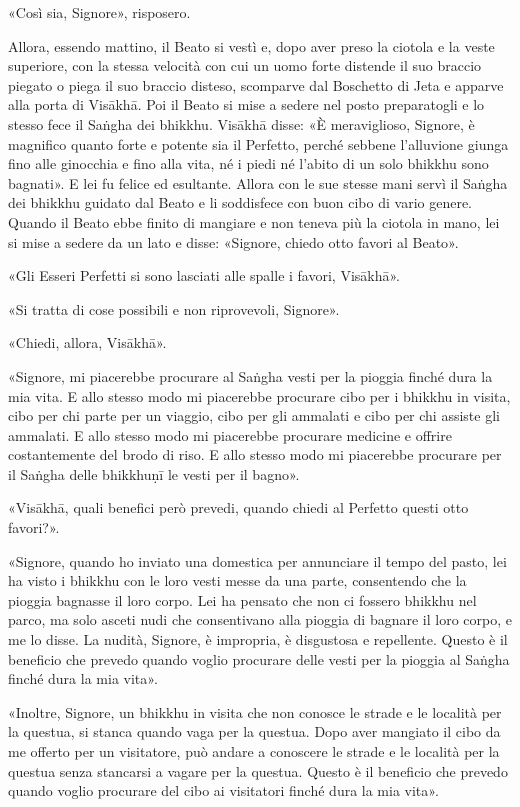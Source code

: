 «Così sia, Signore», risposero.


Allora, essendo mattino, il Beato si vestì e, dopo aver preso la ciotola
e la veste superiore, con la stessa velocità con cui un uomo forte
distende il suo braccio piegato o piega il suo braccio disteso,
scomparve dal Boschetto di Jeta e apparve alla porta di Visākhā. Poi il
Beato si mise a sedere nel posto preparatogli e lo stesso fece il Saṅgha
dei bhikkhu. Visākhā disse: «È meraviglioso, Signore, è magnifico quanto
forte e potente sia il Perfetto, perché sebbene l’alluvione giunga fino
alle ginocchia e fino alla vita, né i piedi né l’abito di un solo
bhikkhu sono bagnati». E lei fu felice ed esultante. Allora con le sue
stesse mani servì il Saṅgha dei bhikkhu guidato dal Beato e li
soddisfece con buon cibo di vario genere. Quando il Beato ebbe finito di
mangiare e non teneva più la ciotola in mano, lei si mise a sedere da un
lato e disse: «Signore, chiedo otto favori al Beato».


«Gli Esseri Perfetti si sono lasciati alle spalle i favori, Visākhā».


«Si tratta di cose possibili e non riprovevoli, Signore».


«Chiedi, allora, Visākhā».


«Signore, mi piacerebbe procurare al Saṅgha vesti per la pioggia finché
dura la mia vita. E allo stesso modo mi piacerebbe procurare cibo per i
bhikkhu in visita, cibo per chi parte per un viaggio, cibo per gli
ammalati e cibo per chi assiste gli ammalati. E allo stesso modo mi
piacerebbe procurare medicine e offrire costantemente del brodo di riso.
E allo stesso modo mi piacerebbe procurare per il Saṅgha delle bhikkhuṇī
le vesti per il bagno».


«Visākhā, quali benefici però prevedi, quando chiedi al Perfetto questi
otto favori?».


«Signore, quando ho inviato una domestica per annunciare il tempo del
pasto, lei ha visto i bhikkhu con le loro vesti messe da una parte,
consentendo che la pioggia bagnasse il loro corpo. Lei ha pensato che
non ci fossero bhikkhu nel parco, ma solo asceti nudi che consentivano
alla pioggia di bagnare il loro corpo, e me lo disse. La nudità,
Signore, è impropria, è disgustosa e repellente. Questo è il beneficio
che prevedo quando voglio procurare delle vesti per la pioggia al Saṅgha
finché dura la mia vita».


«Inoltre, Signore, un bhikkhu in visita che non conosce le strade e le
località per la questua, si stanca quando vaga per la questua. Dopo aver
mangiato il cibo da me offerto per un visitatore, può andare a conoscere
le strade e le località per la questua senza stancarsi a vagare per la
questua. Questo è il beneficio che prevedo quando voglio procurare del
cibo ai visitatori finché dura la mia vita».


